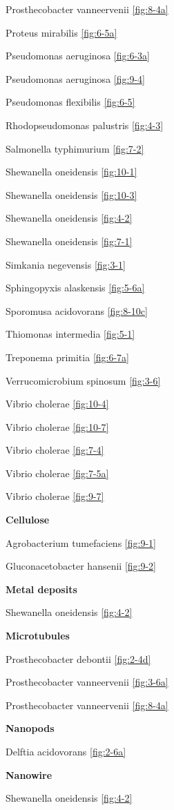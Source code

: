 \documentclass[]{tufte-book}
\begin{document}
Prosthecobacter vanneervenii \ref{fig:8-4a}

Proteus mirabilis \ref{fig:6-5a}

Pseudomonas aeruginosa \ref{fig:6-3a}

Pseudomonas aeruginosa \ref{fig:9-4}

Pseudomonas flexibilis \ref{fig:6-5}

Rhodopseudomonas palustris \ref{fig:4-3}

Salmonella typhimurium \ref{fig:7-2}

Shewanella oneidensis \ref{fig:10-1}

Shewanella oneidensis \ref{fig:10-3}

Shewanella oneidensis \ref{fig:4-2}

Shewanella oneidensis \ref{fig:7-1}

Simkania negevensis \ref{fig:3-1}

Sphingopyxis alaskensis \ref{fig:5-6a}

Sporomusa acidovorans \ref{fig:8-10c}

Thiomonas intermedia \ref{fig:5-1}

Treponema primitia \ref{fig:6-7a}

Verrucomicrobium spinosum \ref{fig:3-6}

Vibrio cholerae \ref{fig:10-4}

Vibrio cholerae \ref{fig:10-7}

Vibrio cholerae \ref{fig:7-4}

Vibrio cholerae \ref{fig:7-5a}

Vibrio cholerae \ref{fig:9-7}

\textbf{Cellulose}

Agrobacterium tumefaciens \ref{fig:9-1}

Gluconacetobacter hansenii \ref{fig:9-2}

\textbf{Metal deposits}

Shewanella oneidensis \ref{fig:4-2}

\textbf{Microtubules}

Prosthecobacter debontii \ref{fig:2-4d}

Prosthecobacter vanneervenii \ref{fig:3-6a}

Prosthecobacter vanneervenii \ref{fig:8-4a}

\textbf{Nanopods}

Delftia acidovorans \ref{fig:2-6a}

\textbf{Nanowire}

Shewanella oneidensis \ref{fig:4-2}
\end{document}
